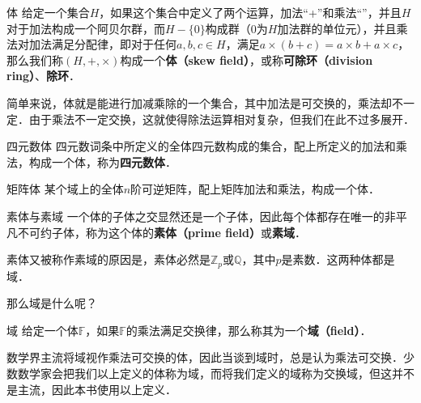 

\begin{definition}{体}
给定一个集合$H$，如果这个集合中定义了两个运算，加法“+”和乘法“\times”，并且$H$对于加法构成一个阿贝尔群，而$H-\{0\}$构成群（$0$为$H$加法群的单位元），并且乘法对加法满足分配律，即对于任何$a, b, c\in H$，满足$a\times(b+c)=a\times b+a\times c$，那么我们称$(H, +, \times)$构成一个\textbf{体（skew field）}，或称\textbf{可除环（division ring）}、\textbf{除环}．
\end{definition}

简单来说，体就是能进行加减乘除的一个集合，其中加法是可交换的，乘法却不一定．由于乘法不一定交换，这就使得除法运算相对复杂，但我们在此不过多展开．

\begin{example}{四元数体}
四元数词条中所定义的全体四元数构成的集合，配上所定义的加法和乘法，构成一个体，称为\textbf{四元数体}．
\end{example}

\begin{example}{矩阵体}
某个域上的全体$n$阶可逆矩阵，配上矩阵加法和乘法，构成一个体．
\end{example}

\begin{definition}{素体与素域}
一个体的子体之交显然还是一个子体，因此每个体都存在唯一的非平凡不可约子体，称为这个体的\textbf{素体（prime field）}或\textbf{素域}．
\end{definition}

素体又被称作素域的原因是，素体必然是$\mathbb{Z}_p$或$\mathbb{Q}$，其中$p$是素数．这两种体都是域．

那么域是什么呢？

\begin{definition}{域}
给定一个体$\mathbb{F}$，如果$\mathbb{F}$的乘法满足交换律，那么称其为一个\textbf{域（field）}．
\end{definition}

数学界主流将域视作乘法可交换的体，因此当谈到域时，总是认为乘法可交换．少数数学家会把我们以上定义的体称为域，而将我们定义的域称为交换域，但这并不是主流，因此本书使用以上定义．
